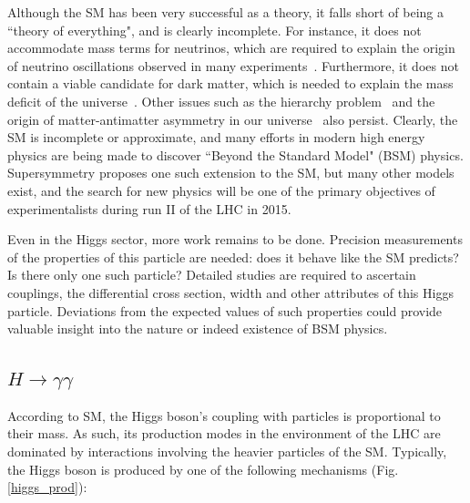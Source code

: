 \documentclass[10pt]{article}
\begin{document}
Although the SM has been very successful as a theory, it falls short of being a “theory of everything", and is clearly incomplete. For instance, it does not accommodate mass terms for neutrinos, which are required to explain the origin of neutrino oscillations observed in many experiments~\cite{SuperK,SNO,DayaBay}. Furthermore, it does not contain a viable candidate for dark matter, which is needed to explain the mass deficit of the universe~\cite{DM}. Other issues such as the hierarchy problem~\cite{Hierarchy} and the origin of matter-antimatter asymmetry in our universe~\cite{Asymmetry} also persist. Clearly, the SM is incomplete or approximate, and many efforts in modern high energy physics are being made to discover “Beyond the Standard Model" (BSM) physics. Supersymmetry proposes one such extension to the SM, but many other models exist, and the search for new physics will be one of the primary objectives of experimentalists during run II of the LHC in 2015.

Even in the Higgs sector, more work remains to be done. Precision measurements of the properties of this particle are needed: does it behave like the SM predicts? Is there only one such particle? Detailed studies are required to ascertain couplings, the differential cross section, width and other attributes of this Higgs particle. Deviations from the expected values of such properties could provide valuable insight into the nature or indeed existence of BSM physics.

\subsection{$H \rightarrow \gamma \gamma$}
According to SM, the Higgs boson's coupling with particles is proportional to their mass. As such, its production modes in the environment of the LHC are dominated by interactions involving the heavier particles of the SM. Typically, the Higgs boson is produced by one of the following mechanisms (Fig. \ref{higgs_prod}):
\end{document}

